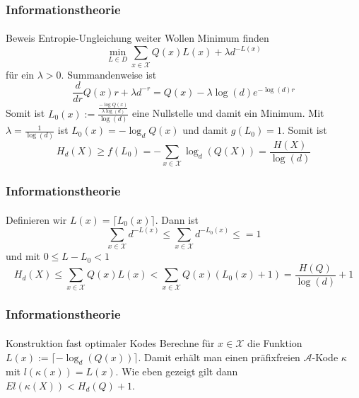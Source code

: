 \documentclass{beamer}
\begin{document}
\begin{frame}
    \frametitle{Informationstheorie}
\framesubtitle{}

\begin{block}{Beweis Entropie-Ungleichung weiter }
Wollen Minimum finden  
$$ \min_{L \in D} \sum_{x \in \mathcal{X}} Q(x) L(x) + \lambda d^{-L(x)}$$
für ein $\lambda > 0$. Summandenweise ist
$$\frac{d}{dr} Q(x) r + \lambda d^{-r} =  Q(x) - \lambda \log(d) e^{-\log(d)r}$$
Somit ist  $L_0(x) := \frac{\frac{- \log Q(x)}{\lambda \log(d)}}{\log(d)}$ eine Nullstelle und damit ein Minimum. Mit $\lambda = \frac{1}{\log(d)}$ ist $L_0(x) = -\log_d Q(x)$  und damit $g(L_0) = 1$. Somit ist
$$ H_d(X) \geq f(L_0) = - \sum_{x \in \mathcal{X}} \log_d (Q(X)) = \frac{H(X)}{\log(d)}$$ 

 \end{block}

 \end{frame}


\begin{frame}
    \frametitle{Informationstheorie}
\framesubtitle{}

\begin{block}{}
Definieren wir $L(x) = \lceil L_0(x) \rceil$. Dann ist 
$$ \sum_{x \in \mathcal{X}} d^{-L(x)} \leq \sum_{x \in \mathcal{X}} d^{-L_0(x)} \leq = 1$$
und mit $0 \leq L - L_0 < 1$ 
$$ H_d(X) \leq  \sum_{x \in \mathcal{X}} Q(x) L(x) <  \sum_{x \in \mathcal{X}} Q(x) (L_0(x) +1) = \frac{H(Q)}{\log(d)} +1$$ 
\end{block}

 \end{frame}

\begin{frame}
    \frametitle{Informationstheorie}
\framesubtitle{}

\begin{block}{Konstruktion fast optimaler Kodes}
Berechne für $x \in \mathcal{X}$ die Funktion $L(x) := \lceil -\log_d(Q(x)) \rceil$. Damit erhält man einen präfixfreien $\mathcal{A}$-Kode
$\kappa$ mit $l(\kappa(x)) = L(x)$. Wie eben gezeigt gilt dann $El(\kappa(X)) < H_d(Q) +1$.
\end{block}

 \end{frame}
\end{document}
